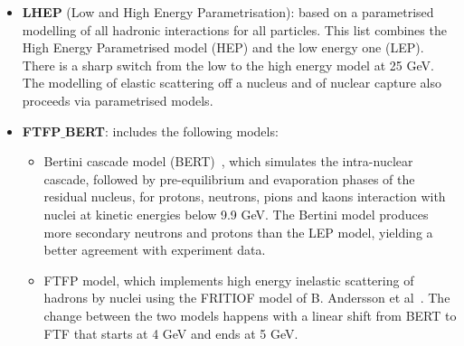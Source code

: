 \begin{itemize}
\item {\bf LHEP} (Low and High Energy Parametrisation): based on a parametrised modelling of all hadronic interactions for all particles.
This list combines the High Energy Parametrised model (HEP) and the low energy one (LEP). There is a sharp switch from the low to the
high energy model at 25 GeV. The modelling of elastic scattering off a nucleus and of nuclear capture also proceeds via parametrised models.
%
\item { \bf FTFP$\_$BERT}: includes the following models:
%
\begin{itemize}
%
\item Bertini cascade model (BERT)~\cite{Bertini:1963zzc}, which simulates the intra-nuclear cascade, followed by pre-equilibrium 
and evaporation phases of the residual nucleus, for protons, neutrons, pions and kaons interaction with 
nuclei at kinetic energies below 9.9 GeV. The Bertini model produces more secondary neutrons and protons
than the LEP model, yielding a better agreement with experiment data.
\item FTFP model, which implements high energy inelastic scattering of hadrons by nuclei using
the FRITIOF model of B. Andersson et al~\cite{Andersson:1992iq}.
%
The change between the two models happens with a linear shift from BERT to FTF that starts at 4 GeV and ends at 5 GeV.
%
\end{itemize}
%
\end{itemize}

